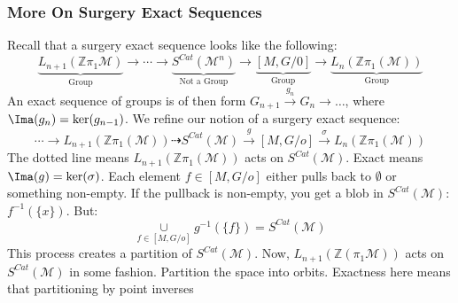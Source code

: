 \documentclass[crop=false,class=article,oneside]{standalone}
\begin{document}
        \subsubsection{More On Surgery Exact Sequences}
            Recall that a surgery exact sequence
            looks like the following:
            \begin{equation*}
                \underset{\textrm{Group}}
                {\underbrace{L_{n+1}(\mathbb{Z}\pi_{1}\mathcal{M})}}
                \rightarrow\cdots\rightarrow
                \underset{\textrm{Not a Group}}
                {\underbrace{S^{Cat}(\mathcal{M}^{n})}}
                \rightarrow
                \underset{\textrm{Group}}
                {\underbrace{[M,G/0]}}
                \rightarrow \underset{\textrm{Group}}
                {\underbrace{L_{n}(\mathbb{Z}\pi_{1}(\mathcal{M}))}} 
            \end{equation*}
            An exact sequence of groups is of then form
            $G_{n+1}\overset{g_{n}}{\rightarrow}%
             G_{n}\rightarrow \hdots$,
             where $\Ima(g_n)=\ker(g_{n-1})$.
             We refine our notion of a surgery exact sequence:
            \begin{equation*}
                \cdots\rightarrow
                L_{n+1}(\mathbb{Z}\pi_{1}(\mathcal{M}))
                \dashrightarrow{S^{Cat}}(\mathcal{M})
                \overset{g}{\rightarrow}[M,G/o]
                \overset{\sigma}{\rightarrow}
                L_{n}(\mathbb{Z}\pi_{1}(\mathcal{M}))
            \end{equation*}
            The dotted line means
            $L_{n+1}(\mathbb{Z}\pi_{1}(\mathcal{M}))$
            acts on $S^{Cat}(\mathcal{M})$.
            Exact means $\Ima(g)=\ker(\sigma)$.
            Each element $f\in{[M,G/o]}$
            either pulls back to $\emptyset$ or
            something non-empty. If the pullback is non-empty,
            you get a blob in
            $S^{Cat}(\mathcal{M})$: $f^{-1}(\{x\})$.
            But:
            \begin{equation*}
                \underset{f\in[M,G/o]}{\cup}g^{-1}(\{f\})
                =S^{Cat}(\mathcal{M})
            \end{equation*}
            This process creates a partition of
            $S^{Cat}(\mathcal{M})$. Now,
            $L_{n+1}(\mathbb{Z}(\pi_{1}\mathcal{M}))$
            acts on $S^{Cat}(\mathcal{M})$ in some fashion.
            Partition the space into orbits. Exactness
            here means that partitioning by point inverses
\end{document}
